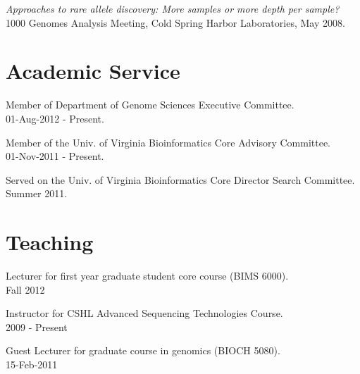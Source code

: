 \documentclass[margin,line]{cv}
\begin{document}
\begin{resume}
    \vspace{-2mm}
    \textit{Approaches to rare allele discovery: More samples or more depth per sample? } \\
    1000 Genomes Analysis Meeting, Cold Spring Harbor Laboratories, May 2008.
    
    \section{\mysidestyle Academic Service}
    
    Member of Department of Genome Sciences Executive Committee.\\
    01-Aug-2012 - Present.
    
    \vspace{-2mm}
    Member of the Univ. of Virginia Bioinformatics Core Advisory Committee.\\
    01-Nov-2011 - Present.
    
    \vspace{-2mm}
    Served on the Univ. of Virginia Bioinformatics Core Director Search Committee. \\
    Summer 2011.



    \section{\mysidestyle Teaching}

    Lecturer for first year graduate student core course (BIMS 6000).\\
    Fall 2012

    \vspace{-2mm}
    Instructor for CSHL Advanced Sequencing Technologies Course.\\
    2009 - Present
    
    \vspace{-2mm}
    Guest Lecturer for graduate course in genomics (BIOCH 5080).\\
    15-Feb-2011    %
    

\end{resume}
\end{document}
